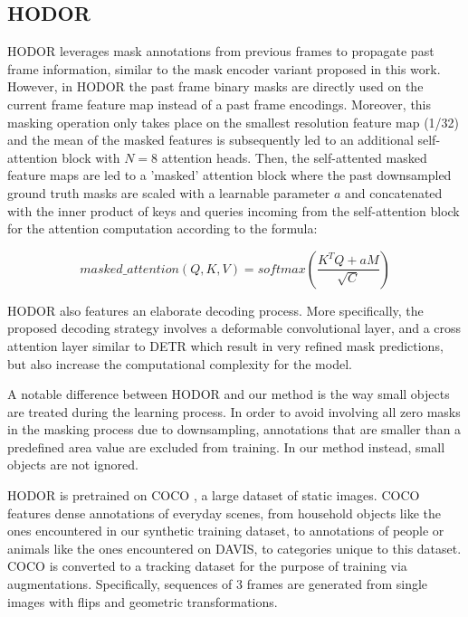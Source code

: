 \subsection{HODOR}

HODOR leverages mask annotations from previous frames to propagate past frame information, similar to the mask encoder variant proposed in this work. However, in HODOR the past frame binary masks are directly used on the current frame feature map instead of a past frame encodings. Moreover, this masking operation only takes place on the smallest resolution feature map (1/32) and the mean of the masked features is subsequently led to an additional self-attention block with $N=8$ attention heads. Then, the self-attented masked feature maps are led to a 'masked' attention block where the past downsampled ground truth masks are scaled with a learnable parameter $a$ and concatenated with the inner product of keys and queries incoming from the self-attention block for the attention computation according to the formula:  \par


\begin{equation}
    \label{eq: masked attention}
    masked\_attention(Q, K, V) = softmax(\frac{K^TQ+aM}{\sqrt{C}})
\end{equation}

HODOR also features an elaborate decoding process. More specifically, the proposed decoding strategy involves a deformable convolutional layer, and a cross attention layer similar to DETR \parencite{DETR} which result in very refined mask predictions, but also increase the computational complexity for the model.
\par
A notable difference between HODOR and our method is the way small objects are treated during the learning process. In order to avoid involving all zero masks in the masking process due to downsampling, annotations that are smaller than a predefined area value are excluded from training. In our method instead, small objects are not ignored. \par

HODOR is pretrained on COCO \parencite{coco}, a large dataset of static images. COCO features dense annotations of everyday scenes, from household objects like the ones encountered in our synthetic training dataset, to annotations of people or animals like the ones encountered on DAVIS, to categories unique to this dataset. COCO is converted to a tracking dataset for the purpose of training via augmentations. Specifically, sequences of 3 frames are generated from single images with flips and geometric transformations. \par

